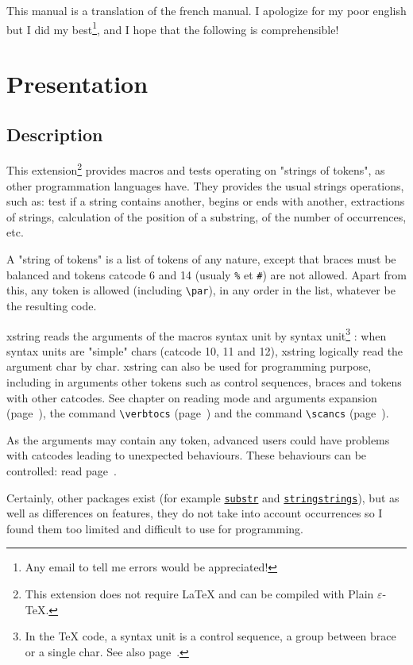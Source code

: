 \documentclass[english,a4paper,10pt]{article}
\newcommand\guill[1]{"#1"}
\newcommand\US{syntax unit\xspace}
\newcommand\USs{syntax units\xspace}
\newcommand\Xstring{\textsf{xstring}\xspace}
\newcommand\verbinline{\lstinline[basicstyle=\normalsize\ttfamily]}
\begin{document}
\tableofcontents

This manual is a translation of the french manual. I apologize for my poor english but I did my best\footnote{Any email to tell me errors would be appreciated!}, and I hope that the following is comprehensible!
\section{Presentation}
\subsection{Description}
This extension\footnote{This extension does not require \LaTeX{} and can be compiled with Plain $\varepsilon$-\TeX{}.} provides macros and tests operating on "strings of tokens", as other programmation languages have. They provides the usual strings operations, such as: test if a string contains another, begins or ends with another, extractions of strings, calculation of the position of a substring, of the number of occurrences, etc.\medskip

A "string of tokens" is a list of tokens of any nature, except that braces must be balanced and tokens catcode 6 and 14 (usualy \verb|%| et \verb|#|) are not allowed. Apart from this, any token is allowed (including \verbinline|\par|), in any order in the list, whatever be the resulting code.\medskip

\Xstring reads the arguments of the macros \US by \US\footnote{In the \TeX{} code, a \US is a control sequence, a group between brace or a single char. See also page~\pageref{developpementarguments}.} : when \USs are \guill{simple} chars (catcode 10, 11 and 12), \Xstring logically read the argument char by char. \Xstring can also be used for programming purpose, including in arguments other tokens such as control sequences, braces and tokens with other catcodes. See chapter on reading mode and arguments expansion (page~\pageref{developpementarguments}), the command \verbinline|\verbtocs| (page~\pageref{verbtocs}) and the command \verbinline|\scancs| (page~\pageref{scancs}).\medskip

As the arguments may contain any token, advanced users could have problems with catcodes leading to unexpected behaviours. These behaviours can be controlled: read page~\pageref{macrosetoilees}.\medskip

Certainly, other packages exist (for example \href{http://mirror.ctan.org/tex-archive/macros/latex/contrib/substr/}{\nolinkurl{substr}} and \href{http://mirror.ctan.org/tex-archive/macros/latex/contrib/stringstrings/}{\nolinkurl{stringstrings}}), but as well as differences on features, they do not take into account occurrences so I found them too limited and difficult to use for programming.
\end{document}
